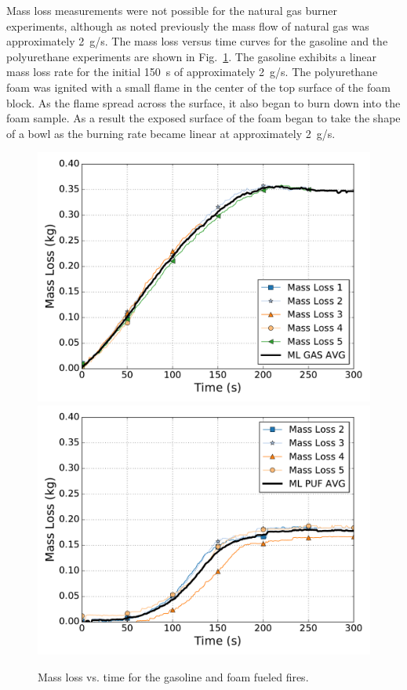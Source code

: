 \documentclass[twoside]{uocthesis}
\begin{document}
{Mass loss measurements were not possible for the natural gas burner experiments, although as noted previously the mass flow of natural gas was approximately 2~g/s.  The mass loss versus time curves for the gasoline and the polyurethane experiments are shown in Fig.~\ref{Mass}.  The gasoline exhibits a linear mass loss rate for the initial 150~s of approximately 2~g/s.  The polyurethane foam was ignited with a small flame in the center of the top surface of the foam block.  As the flame spread across the surface, it also began to burn down into the foam sample.  As a result the exposed surface of the foam began to take the shape of a bowl as the burning rate became linear at approximately 2~g/s.

\begin{figure}[p]
  \centering
  \includegraphics[width=4.5in]{../Figures/ML_GAS}\\
  \includegraphics[width=4.5in]{../Figures/ML_PUF}\\
  \caption[Mass loss vs. time for the gasoline and foam fueled fires]{Mass loss vs. time for the gasoline and foam fueled fires.}
  \label{Mass}
\end{figure}

}
\end{document}
